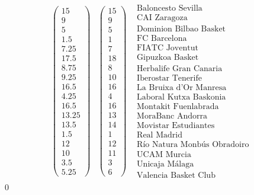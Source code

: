 	\[
	\begin{array}{ccc}
	\left(\begin{array}{c}
	15\\
	9\\
	5\\
	1.5\\
	7.25\\
	17.5\\
	8.75\\
	9.25\\
	16.5\\
	4.25\\
	16.5\\
	13.25\\
	13.5\\
	1.5\\
	12\\
	10\\
	3.5\\
	5.25
	\end{array} \right) & \left(\begin{array}{c}
	15\\
	9\\
	5\\
	1\\
	7\\
	18\\
	8\\
	10\\
	16\\
	4\\
	16\\
	13\\
	14\\
	1\\
	12\\
	11\\
	3\\
	6
	\end{array} \right) & \begin{array}{c}
	\text{Baloncesto Sevilla}\\
	\text{CAI Zaragoza} \\
	\text{Dominion Bilbao Basket} \\
	\text{FC Barcelona} \\
	\text{FIATC Joventut} \\
	\text{Gipuzkoa Basket} \\
	\text{Herbalife Gran Canaria} \\
	\text{Iberostar Tenerife} \\
	\text{La Bruixa d'Or Manresa} \\
	\text{Laboral Kutxa Baskonia} \\
	\text{Montakit Fuenlabrada} \\
	\text{MoraBanc Andorra} \\
	\text{Movistar Estudiantes} \\
	\text{Real Madrid} \\
	\text{Río Natura Monbús Obradoiro} \\
	\text{UCAM Murcia} \\
	\text{Unicaja Málaga} \\
	\text{Valencia Basket Club}
	\end{array} 
	\end{array} 
	\]	
\qed

